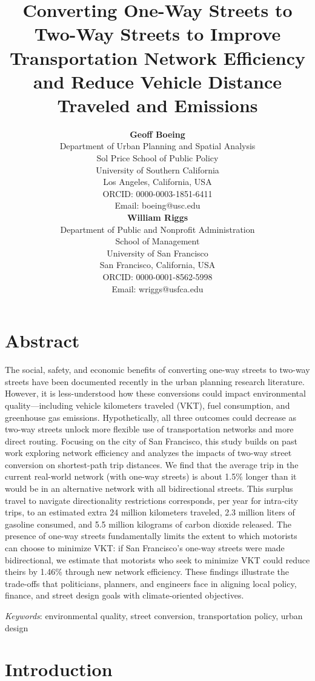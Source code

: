 \documentclass{trbunofficial}
\title{Converting One-Way Streets to Two-Way Streets to Improve Transportation Network Efficiency and Reduce Vehicle Distance Traveled and Emissions}
\author{%
  \textbf{Geoff Boeing}\\
  Department of Urban Planning and Spatial Analysis\\
  Sol Price School of Public Policy\\
  University of Southern California\\
  Los Angeles, California, USA\\
  ORCID: 0000-0003-1851-6411\\
  Email: boeing@usc.edu\\
  \hfill\break%
  \textbf{William Riggs}\\
  Department of Public and Nonprofit Administration\\
  School of Management\\
  University of San Francisco\\
  San Francisco, California, USA\\
  ORCID: 0000-0001-8562-5998\\
  Email: wriggs@usfca.edu
}
\begin{document}
\maketitle

\section{Abstract}

The social, safety, and economic benefits of converting one-way streets to two-way streets have been documented recently in the urban planning research literature. However, it is less-understood how these conversions could impact environmental quality---including vehicle kilometers traveled (VKT), fuel consumption, and greenhouse gas emissions. Hypothetically, all three outcomes could decrease as two-way streets unlock more flexible use of transportation networks and more direct routing. Focusing on the city of San Francisco, this study builds on past work exploring network efficiency and analyzes the impacts of two-way street conversion on shortest-path trip distances. We find that the average trip in the current real-world network (with one-way streets) is about 1.5\% longer than it would be in an alternative network with all bidirectional streets. This surplus travel to navigate directionality restrictions corresponds, per year for intra-city trips, to an estimated extra 24 million kilometers traveled, 2.3 million liters of gasoline consumed, and 5.5 million kilograms of carbon dioxide released. The presence of one-way streets fundamentally limits the extent to which motorists can choose to minimize VKT: if San Francisco's one-way streets were made bidirectional, we estimate that motorists who seek to minimize VKT could reduce theirs by 1.46\% through new network efficiency. These findings illustrate the trade-offs that politicians, planners, and engineers face in aligning local policy, finance, and street design goals with climate-oriented objectives.

\hfill\break%
\noindent\textit{Keywords}: environmental quality, street conversion, transportation policy, urban design
\newpage

\section{Introduction}
\end{document}
